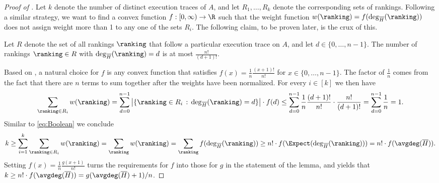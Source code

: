 \begin{proof}[Proof of ]
Let $k$ denote the number of distinct execution traces of $A$, and let $R_1, \dots, R_k$ denote the corresponding sets of rankings. 
Following a similar strategy, we want to find a convex function $f: [0,\infty)\to \R$ such that the weight function $w(\ranking) = f(\deg_{\overline{H}}(\ranking))$ does not assign weight more than 1 to any one of the sets $R_i$. The following claim, to be proven later, is the crux of this.

\begin{claim}\label{claim:encoding}
Let $R$ denote the set of all rankings $\ranking$ that follow a particular execution trace on $A$, and let $d \in \{0,\dots,n-1\}$. The number of rankings $\ranking \in R$ with $\deg_{\overline{H}}(\ranking) = d$ is at most $\frac{n!}{(d+1)!}$.
\end{claim}

Based on , a natural choice for $f$ is any convex function that satisfies $f(x) = \frac{1}{n} \frac{(x+1)!}{n!}$ for $x \in \{0,\dots,n-1\}$. The factor of $\frac{1}{n}$ comes from the fact that there are $n$ terms to sum together after the weights have been normalized. For every $i \in [k]$ we then have
\[ \sum_{\ranking \in R_i} w(\ranking) = \sum_{d=0}^{n-1} \left| \{ \ranking \in R_i \, : \, \deg_{\overline{H}}(\ranking) = d \} \right| \cdot f(d) \le \sum_{d=0}^{n-1} \frac{1}{n} \frac{(d+1)!}{n!} \cdot \frac{n!}{(d+1)!} = \sum_{d=0}^{n-1} \frac{1}{n} = 1. \]
Similar to \eqref{eq:Boolean} we conclude
\begin{equation}\label{eq:lb:k}
k \ge \sum_{i=1}^k \sum_{\ranking \in R_i} w(\ranking) 
= \sum_\ranking w(\ranking)
= \sum_\ranking f(\deg_{\overline{H}}(\ranking)) \ge n! \cdot f(\Expect(\deg_{\overline{H}}(\ranking))) = n! \cdot f(\avgdeg(\overline{H})). 
\end{equation}
Setting $f(x) = \frac{1}{n} \frac{g(x+1)}{n!}$ turns the requirements for $f$ into those for $g$ in the statement of the lemma, and yields that $k \ge n! \cdot f(\avgdeg(\overline{H})) = g(\avgdeg(\overline{H})+1)/n$. 
\end{proof}

